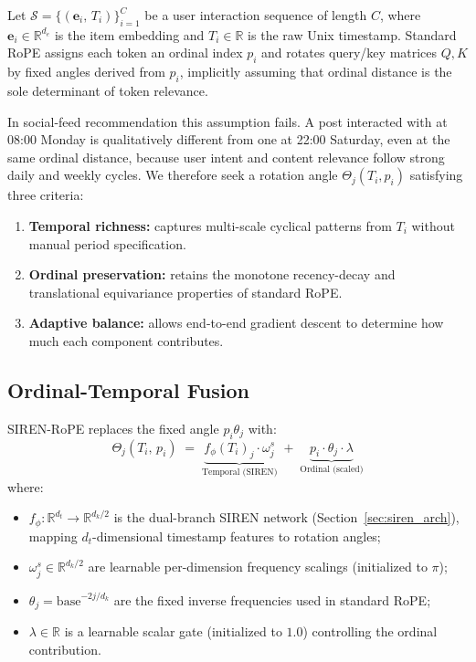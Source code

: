 \documentclass{article}
\begin{document}
Let $\mathcal{S} = \bigl\{(\mathbf{e}_i,\, T_i)\bigr\}_{i=1}^{C}$ be a
user interaction sequence of length $C$, where $\mathbf{e}_i \in \mathbb{R}^{d_e}$
is the item embedding and $T_i \in \mathbb{R}$ is the raw Unix timestamp.
Standard RoPE assigns each token an ordinal index $p_i$ and rotates
query/key matrices $Q,K$ by fixed angles derived from $p_i$, implicitly
assuming that ordinal distance is the sole determinant of token relevance.

In social-feed recommendation this assumption fails. A post interacted with
at 08:00 Monday is qualitatively different from one at 22:00 Saturday, even
at the same ordinal distance, because user intent and content relevance follow
strong daily and weekly cycles. We therefore seek a rotation angle
$\Theta_j(T_i, p_i)$ satisfying three criteria:
\begin{enumerate}
  \item \textbf{Temporal richness:} captures multi-scale cyclical patterns
    from $T_i$ without manual period specification.
  \item \textbf{Ordinal preservation:} retains the monotone recency-decay and
    translational equivariance properties of standard RoPE.
  \item \textbf{Adaptive balance:} allows end-to-end gradient descent to
    determine how much each component contributes.
\end{enumerate}

\subsection{Ordinal-Temporal Fusion}

SIREN-RoPE replaces the fixed angle $p_i \theta_j$ with:
\begin{equation}
  \boxed{
    \Theta_j(T_i,\, p_i)
    \;=\;
    \underbrace{f_{\phi}(T_i)_j \cdot \omega^{s}_j}_{\text{Temporal (SIREN)}}
    \;+\;
    \underbrace{p_i \cdot \theta_j \cdot \lambda}_{\text{Ordinal (scaled)}}
  }
  \label{eq:siren_rope}
\end{equation}
where:
\begin{itemize}
  \item $f_{\phi}: \mathbb{R}^{d_t} \to \mathbb{R}^{d_k/2}$ is the
    dual-branch SIREN network (Section~\ref{sec:siren_arch}), mapping
    $d_t$-dimensional timestamp features to rotation angles;
  \item $\omega^{s}_j \in \mathbb{R}^{d_k/2}$ are learnable per-dimension
    frequency scalings (initialized to $\pi$);
  \item $\theta_j = \mathrm{base}^{-2j/d_k}$ are the fixed inverse frequencies
    used in standard RoPE;
  \item $\lambda \in \mathbb{R}$ is a learnable scalar gate (initialized
    to $1.0$) controlling the ordinal contribution.
\end{itemize}
\end{document}
